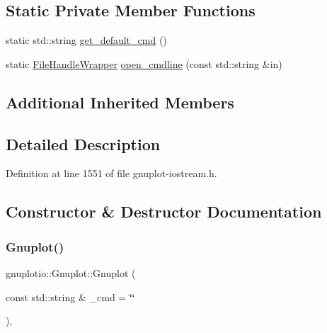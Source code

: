 \subsection*{Static Private Member Functions}
\begin{DoxyCompactItemize}
\item 
static std\+::string \hyperlink{classgnuplotio_1_1_gnuplot_ab71bb407b7d2154c9b8ca3754ffb1721}{get\+\_\+default\+\_\+cmd} ()
\item 
static \hyperlink{structgnuplotio_1_1_file_handle_wrapper}{File\+Handle\+Wrapper} \hyperlink{classgnuplotio_1_1_gnuplot_a84c5911c1a5d3eb93a6f3bd0b86ef338}{open\+\_\+cmdline} (const std\+::string \&in)
\end{DoxyCompactItemize}
\subsection*{Additional Inherited Members}


\subsection{Detailed Description}


Definition at line 1551 of file gnuplot-\/iostream.\+h.



\subsection{Constructor \& Destructor Documentation}
\mbox{\label{classgnuplotio_1_1_gnuplot_ab2fb14389ab63ad5d9b2e57169bbbf1d}} 
\subsubsection{\texorpdfstring{Gnuplot()}{Gnuplot()}\hspace{0.1cm}{\footnotesize\ttfamily [1/3]}}
{\footnotesize\ttfamily gnuplotio\+::\+Gnuplot\+::\+Gnuplot (\begin{DoxyParamCaption}\item[{const std\+::string \&}]{\+\_\+cmd = {\ttfamily \char`\"{}\char`\"{}} }\end{DoxyParamCaption})\hspace{0.3cm}{\ttfamily [inline]}, {\ttfamily [explicit]}}



